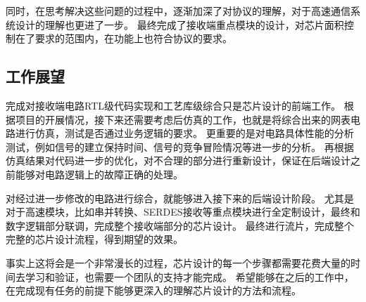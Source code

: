 \documentclass[UTF8]{ctexart}
\begin{document}
同时，在思考解决这些问题的过程中，逐渐加深了对协议的理解，对于高速通信系统设计的理解也更进了一步。
最终完成了接收端重点模块的设计，对芯片面积控制在了要求的范围内，在功能上也符合协议的要求。

\subsection{工作展望}

完成对接收端电路RTL级代码实现和工艺库级综合只是芯片设计的前端工作。
根据项目的开展情况，接下来还需要考虑后仿真的工作，也就是将综合出来的网表电路进行仿真，测试是否通过业务逻辑的要求。
更重要的是对电路具体性能的分析测试，例如信号的建立保持时间、信号的竞争冒险情况等进一步的分析。
再根据仿真结果对代码进一步的优化，对不合理的部分进行重新设计，保证在后端设计之前能够对电路逻辑上的故障正确的处理。

对经过进一步修改的电路进行综合，就能够进入接下来的后端设计阶段。
尤其是对于高速模块，比如串并转换、SERDES接收等重点模块进行全定制设计，最终和数字逻辑部分联调，完成整个接收端部分的芯片设计。
最终进行流片，完成整个完整的芯片设计流程，得到期望的效果。

事实上这将会是一个非常漫长的过程，芯片设计的每一个步骤都需要花费大量的时间去学习和验证，也需要一个团队的支持才能完成。
希望能够在之后的工作中，在完成现有任务的前提下能够更深入的理解芯片设计的方法和流程。


\end{document}
